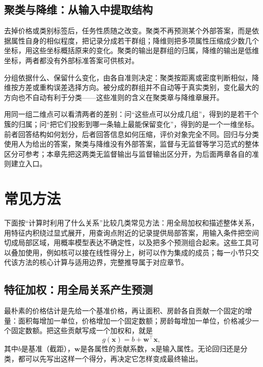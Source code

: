 \subsection{聚类与降维：从输入中提取结构}
\label{sec:classic-overview-unsupervised}

去掉价格或类别标签后，任务性质随之改变。聚类不再预测某个外部答案，而是依据属性自身的相似程度，把记录分成若干群组；降维则把多项属性压缩成少数几个坐标，用这些坐标概括原来的变化。聚类的输出是群组的归属，降维的输出是低维坐标，两者都没有外部标准答案可供核对。

分组依据什么、保留什么变化，由各自准则决定：聚类按距离或密度判断相似，降维按方差或重构误差选择方向。被分成的群组并不自动等于真实类别，变化最大的方向也不自动有利于分类——这些准则的含义在聚类章与降维章展开。

用同一组二维点可以看清两者的差别：问“这些点可以分成几组”，得到的是若干个簇的归属；问“把它们投影到哪一条轴上最能保留变化”，得到的是一个一维坐标。前者回答结构如何划分，后者回答信息如何压缩，评价对象完全不同。回归与分类使用人为给出的答案，聚类与降维没有外部答案，监督与无监督等学习范式的整体区分可参考；本章先把这两类无监督输出与监督输出区分开，为后面两章各自的准则建立入口。

\section{常见方法}
\label{sec:classic-common-methods}

下面按“计算时利用了什么关系”比较几类常见方法：用全局加权和描述整体关系，用特征内积绕过显式展开，用查询点附近的记录提供局部答案，用输入条件把空间切成局部区域，用概率模型表达不确定性，以及把多个预测组合起来。这些工具可以叠加使用，例如核可以接在线性得分上，树可以作为集成的成员；每一小节只交代该方法的核心计算与适用边界，完整推导属于对应章节。

\subsection{特征加权：用全局关系产生预测}
\label{sec:classic-overview-linear}

最朴素的价格估计是先给一个基准价格，再让面积、房龄各自贡献一个固定的增量：面积每增加一单位，价格增加一个固定数额；房龄每增加一单位，价格减少一个固定数额。把这些贡献写成一个加权和，就是
\begin{equation}
  g(\bm x)=b+\bm w^{\top}\bm x,
  \label{eq:classic-overview-linear-score}
\end{equation}
其中$b$是基准（截距），$\bm w$是各属性的贡献系数，$\bm x$是输入属性。无论回归还是分类，都可以先写出这样一个得分，再决定它怎样变成最终输出。

